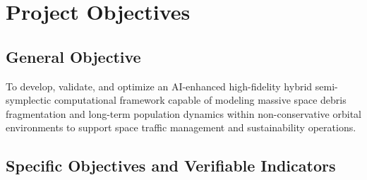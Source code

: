 \documentclass[11pt,letterpaper]{article}
\begin{document}
\section{Project Objectives}

\subsection{General Objective}
To develop, validate, and optimize an AI-enhanced high-fidelity hybrid semi-symplectic computational framework capable of modeling massive space debris fragmentation and long-term population dynamics within non-conservative orbital environments to support space traffic management and sustainability operations.

\subsection{Specific Objectives and Verifiable Indicators}
\end{document}
